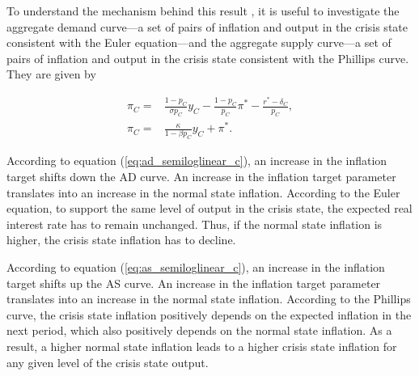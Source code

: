 \documentclass[11pt]{article}
\begin{document}
\begin{singlespace}
		To understand the mechanism behind this result , it is useful to investigate the aggregate demand curve---a set of pairs of inflation and output in the crisis state consistent with the  Euler equation---and the aggregate supply curve---a set of pairs of inflation and output in the crisis state consistent with the Phillips curve. They are given by
		
		\begin{align}
			\pi_C =& \frac{1-p_C}{\sigma p_C}y_C - \frac{1-p_C}{p_C}\pi^* - \frac{r^* - \delta_C}{p_C},\label{eq:ad_semiloglinear_c}\\
			\pi_C =& \frac{\kappa }{1-\beta p_C}y_C+\pi^*.\label{eq:as_semiloglinear_c}
		\end{align}
		
		 According to equation (\ref{eq:ad_semiloglinear_c}), an increase in the inflation target shifts down the AD curve. An increase in the inflation target parameter translates into an increase in the normal state inflation. According to the Euler equation, to support the same level of output in the crisis state, the expected real interest rate has to remain unchanged. Thus, if the normal state inflation is higher, the crisis state inflation has to decline.
		
		According to equation (\ref{eq:as_semiloglinear_c}), an increase in the inflation target shifts up the AS curve. An increase in the inflation target parameter translates into an increase in the normal state inflation. According to the Phillips curve, the crisis state inflation positively depends on the expected inflation in the next period, which also positively depends on the normal state inflation. As a result, a higher normal state inflation leads to a higher crisis state inflation for any given level of the crisis state output.
		
		

\end{singlespace}
\end{document}
